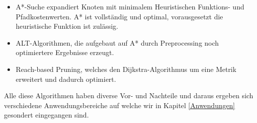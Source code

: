 \begin{itemize}
\begin{itemize}
        \item A*-Suche expandiert Knoten mit minimalem Heuristischen Funktions- und Pfadkostenwerten. A* ist vollständig und optimal, vorausgesetzt die heuristische Funktion ist zulässig.
        \item ALT-Algorithmen, die aufgebaut auf A* durch Preprocessing noch optimiertere Ergebnisse erzeugt.
        \item Reach-based Pruning, welches den Dijkstra-Algorithmus um eine Metrik erweitert und dadurch optimiert.
    \end{itemize}
\end{itemize}
\cite{Russell:10d}

Alle diese Algorithmen haben diverse Vor- und Nachteile und daraus ergeben sich verschiedene 
Anwendungsbereiche auf welche wir in Kapitel \ref*{Anwendungen} gesondert eingegangen sind.
